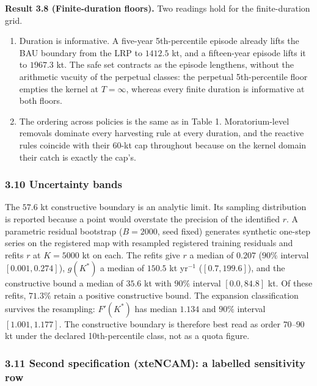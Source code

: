 \documentclass[11pt]{article}
\begin{document}
\textbf{Result 3.8 (Finite-duration floors).} Two readings hold for the
finite-duration grid.

\begin{enumerate}
\def\labelenumi{(\roman{enumi})}
\item
  Duration is informative. A five-year 5th-percentile episode already
  lifts the BAU boundary from the LRP to \(1412.5\) kt, and a
  fifteen-year episode lifts it to \(1967.3\) kt. The safe set contracts
  as the episode lengthens, without the arithmetic vacuity of the
  perpetual classes: the perpetual 5th-percentile floor empties the
  kernel at \(T = \infty\), whereas every finite duration is informative
  at both floors.
\item
  The ordering across policies is the same as in Table 1.
  Moratorium-level removals dominate every harvesting rule at every
  duration, and the reactive rules coincide with their 60-kt cap
  throughout because on the kernel domain their catch is exactly the
  cap's.
\end{enumerate}

\subsubsection{3.10 Uncertainty bands}\label{uncertainty-bands}

The \(57.6\) kt constructive boundary is an analytic limit. Its sampling
distribution is reported because a point would overstate the precision
of the identified \(r\). A parametric residual bootstrap (\(B = 2000\),
seed fixed) generates synthetic one-step series on the registered map
with resampled registered training residuals and refits \(r\) at
\(K = 5000\) kt on each. The refits give \(r\) a median of \(0.207\)
(\(90\%\) interval \([0.001, 0.274]\)), \(g(K^*)\) a median of \(150.5\)
kt yr\(^{-1}\) (\([0.7, 199.6]\)), and the constructive bound a median
of \(35.6\) kt with \(90\%\) interval \([0.0, 84.8]\) kt. Of these
refits, \(71.3\%\) retain a positive constructive bound. The expansion
classification survives the resampling: \(F'(K^*)\) has median \(1.134\)
and \(90\%\) interval \([1.001, 1.177]\). The constructive boundary is
therefore best read as order \(70\)--\(90\) kt under the declared
10th-percentile class, not as a quota figure.

\subsubsection{3.11 Second specification (xteNCAM): a labelled
sensitivity
row}\label{second-specification-xtencam-a-labelled-sensitivity-row}
\end{document}
